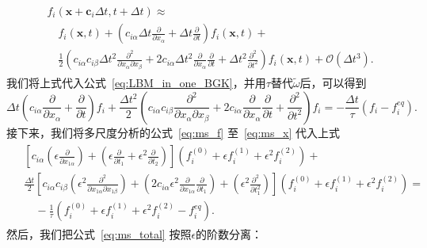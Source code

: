 \begin{align}
    \begin{split}
        & f_{i}\left(\boldsymbol{x}+\mathbf{c}_{i} \Delta t, t+\Delta t\right) \approx \\
        & \quad f_{i}(\boldsymbol{x}, t)+\left({c}_{i \alpha} \Delta t \frac{\partial}{\partial x_{\alpha}}+\Delta t \frac{\partial}{\partial t}\right) f_{i}(\boldsymbol{x}, t)+ \\
        & \quad \frac{1}{2}\left({c}_{i \alpha} {c}_{i \beta} \Delta t^{2} \frac{\partial^{2}}{\partial x_{\alpha} \partial x_{\beta}}+2 {c}_{i \alpha} \Delta t^{2} \frac{\partial}{\partial x_{\alpha}} \frac{\partial}{\partial t}+\Delta t^{2} \frac{\partial^{2}}{\partial t^{2}}\right) f_{i}(\boldsymbol{x}, t)+\mathcal{O}\left(\Delta t^{3}\right) .
    \end{split}
    \label{eq:ms_taylor}
\end{align}
我们将上式代入公式~\ref{eq:LBM_in_one_BGK}，并用$\tau$替代$\tilde{\omega}$后，可以得到
\begin{equation}
\Delta t\left({c}_{i \alpha} \frac{\partial}{\partial x_{\alpha}}+\frac{\partial}{\partial t}\right) f_{i}+\frac{\Delta t^{2}}{2}\left({c}_{i \alpha} {c}_{i \beta} \frac{\partial^{2}}{\partial x_{\alpha} \partial x_{\beta}}+2 {c}_{i \alpha} \frac{\partial}{\partial x_{\alpha}} \frac{\partial}{\partial t}+\frac{\partial^{2}}{\partial t^{2}}\right) f_{i}=-\frac{\Delta t}{\tau}\left(f_{i}-f_{i}^{e q}\right) .
\end{equation}
接下来，我们将多尺度分析的公式~\ref{eq:ms_f} 至~\ref{eq:ms_x} 代入上式
\begin{align}
    \begin{split}
& {\left[{c}_{i \alpha}\left(\epsilon \frac{\partial}{\partial x_{1 \alpha}}\right)+\left(\epsilon \frac{\partial}{\partial t_{1}}+\epsilon^{2} \frac{\partial}{\partial t_{2}}\right)\right]\left(f_{i}^{(0)}+\epsilon f_{i}^{(1)}+\epsilon^{2} f_{i}^{(2)}\right)+} \\
& \frac{\Delta t}{2}\left[{c}_{i \alpha} {c}_{i \beta}\left(\epsilon^{2} \frac{\partial^{2}}{\partial x_{1 \alpha} \partial x_{1 \beta}}\right)+\left(2 {c}_{i \alpha} \epsilon^{2} \frac{\partial}{\partial x_{1 \alpha}} \frac{\partial}{\partial t_{1}}\right)+\left(\epsilon^{2} \frac{\partial^{2}}{\partial t_{1}^{2}}\right)\right]\left(f_{i}^{(0)}+\epsilon f_{i}^{(1)}+\epsilon^{2} f_{i}^{(2)}\right)= \\
& \quad-\frac{1}{\tau}\left(f_{i}^{(0)}+\epsilon f_{i}^{(1)}+\epsilon^{2} f_{i}^{(2)}-f_{i}^{e q}\right) .
    \end{split}
    \label{eq:ms_total}
\end{align}
然后，我们把公式~\ref{eq:ms_total} 按照$\epsilon$的阶数分离：

